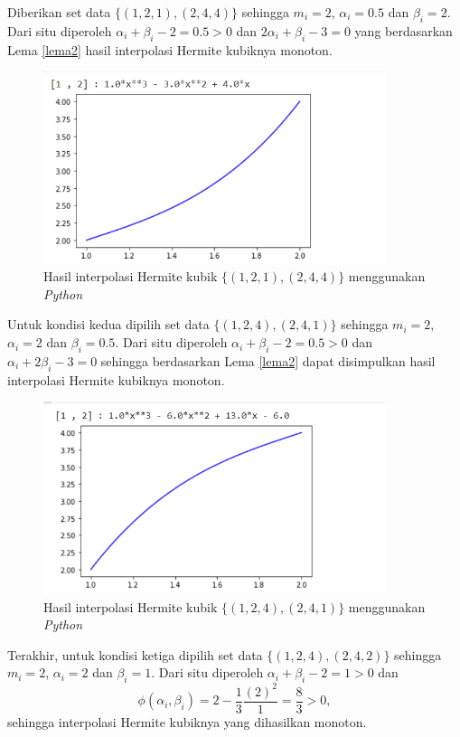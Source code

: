 \begin{contoh}
     Diberikan set data $\{(1,2,1),(2,4,4)\}$ sehingga $m_i=2$, $\alpha_i=0.5$ dan $\beta_i=2$. Dari situ diperoleh $\alpha_i+\beta_i-2=0.5>0$ dan $2\alpha_i+\beta_i-3 = 0 $ yang berdasarkan Lema \ref{lema2} hasil interpolasi Hermite kubiknya monoton.
     \begin{figure}[H]
         \centering
         \includegraphics[width=10cm]{Images/contohLema2.1Hermite.png}
         \caption{Hasil interpolasi Hermite kubik $\{(1,2,1),(2,4,4)\}$ menggunakan \textit{Python}}
         \label{Gambar3.6}
     \end{figure}
     Untuk kondisi kedua dipilih set data $\{(1,2,4),(2,4,1)\}$ sehingga $m_i=2$, $\alpha_i=2$ dan $\beta_i=0.5$. Dari situ diperoleh $\alpha_i+\beta_i-2=0.5>0$ dan \mbox{$\alpha_i+2\beta_i-3 = 0 $} sehingga berdasarkan Lema \ref{lema2} dapat disimpulkan hasil interpolasi Hermite kubiknya monoton.
     \begin{figure}[H]
         \centering
         \includegraphics[width=10cm]{Images/contohLema2.2Hermite.png}
         \caption{Hasil interpolasi Hermite kubik $\{(1,2,4),(2,4,1)\}$ menggunakan \textit{Python}}
         \label{Gambar3.7}
     \end{figure}
     Terakhir, untuk kondisi ketiga dipilih set data $\{(1,2,4),(2,4,2)\}$ sehingga $m_i=2$, $\alpha_i=2$ dan $\beta_i=1$. Dari situ diperoleh $\alpha_i+\beta_i-2=1>0$ dan 
     $$\phi(\alpha_i,\beta_i) = 2 - \frac{1}{3}\frac{(2)^2}{1}=\frac{8}{3}>0,$$ sehingga interpolasi Hermite kubiknya yang dihasilkan monoton.

\end{contoh}
